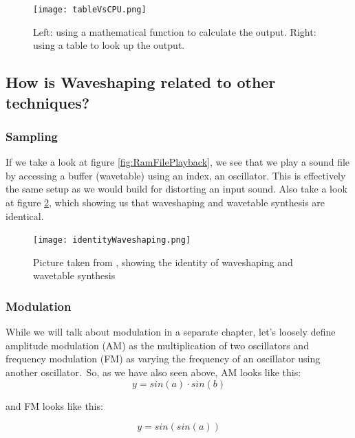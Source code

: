 \begin{figure}[H]
	\begin{center}
		\texttt{[image: tableVsCPU.png]}
		\caption{Left: using a mathematical function to calculate the output. Right: using a table to look up the output.}
		\label{fig:tableVsCPU}
	\end{center}
\end{figure}





\subsection{How is Waveshaping related to other techniques?}
\subsubsection{Sampling}
If we take a look at figure \ref{fig:RamFilePlayback}, we see that we play a sound file by accessing a buffer (wavetable) using an index, an oscillator. This is effectively the same setup as we would build for distorting an input sound. Also take a look at figure \ref{fig:identity}, which showing us that waveshaping and wavetable synthesis are identical.

\begin{figure}[H]
	\centering
	\texttt{[image: identityWaveshaping.png]}
	\caption[farnell waveshaping identity]
	{Picture taken from \cite{farnell_designing_2010}, showing the identity of waveshaping and wavetable synthesis}
	\label{fig:identity}
\end{figure}



\subsubsection{Modulation}
While we will talk about modulation in a separate chapter, let's loosely define amplitude modulation (AM) as the multiplication of two oscillators and frequency modulation (FM) as varying the frequency of an oscillator using another oscillator.\
So, as we have also seen above, AM looks like this:
\begin{equation}
	y = sin(a)\cdot sin(b)
\end{equation}

and FM looks like this:

\begin{equation}
	y = sin(sin(a))
\end{equation}

